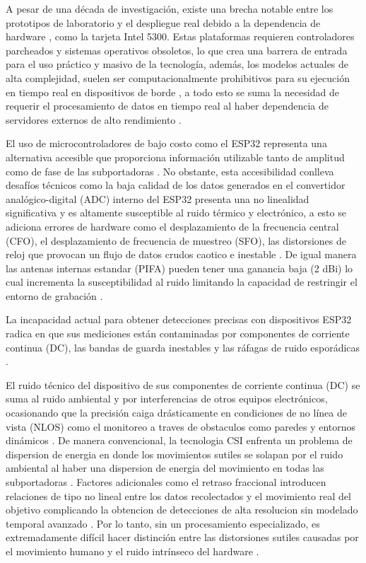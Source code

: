 \documentclass[12pt, a4paper]{article}
\begin{document}
A pesar de una década de investigación, existe una brecha notable entre los prototipos de laboratorio y el despliegue real debido a la dependencia de hardware , como la tarjeta Intel 5300. Estas plataformas requieren controladores parcheados y sistemas operativos obsoletos, lo que crea una barrera de entrada para el uso práctico y masivo de la tecnología, además, los modelos actuales de alta complejidad, suelen ser computacionalmente prohibitivos para su ejecución en tiempo real en dispositivos de borde \cite{kim2026csi} \cite{wiesp}, a todo esto se suma la necesidad de requerir el procesamiento de datos en tiempo real al haber dependencia de servidores externos de alto rendimiento \cite{9900419}.

El uso de microcontroladores de bajo costo como el ESP32 representa una alternativa accesible que proporciona información utilizable tanto de amplitud como de fase de las subportadoras \cite{chaudhari2026device}. No obstante, esta accesibilidad conlleva desafíos técnicos como la baja calidad de los datos generados en el convertidor analógico-digital (ADC) interno del ESP32 presenta una no linealidad significativa y es altamente susceptible al ruido térmico y electrónico, a esto se adiciona errores de hardware como el desplazamiento de la frecuencia central (CFO), el desplazamiento de frecuencia de muestreo (SFO), las distorsiones de reloj que provocan un flujo de datos crudos caotico e inestable \cite{9900419}. De igual manera las antenas internas estandar (PIFA) pueden tener una ganancia baja (2 dBi) lo cual incrementa la susceptibilidad al ruido limitando la capacidad de restringir el entorno de grabación \cite{strohmayer_wifi_2023}.

La incapacidad actual para obtener detecciones precisas con dispositivos ESP32 radica en que sus mediciones están contaminadas por componentes de corriente continua (DC), las bandas de guarda inestables y las ráfagas de ruido esporádicas \cite{kim2026csi}.

El ruido técnico del dispositivo de sus componentes de corriente continua (DC) se suma al ruido ambiental y por interferencias de otros equipos electrónicos, ocasionando que la precisión caiga drásticamente en condiciones de no línea de vista (NLOS) como el monitoreo a traves de obstaculos como paredes y entornos dinámicos \cite{kim2026csi}. De manera convencional, la tecnologia CSI enfrenta un problema de dispersion de energia en donde los movimientos sutiles se solapan por el ruido ambiental al haber una dispersion de energia del movimiento en todas las subportadoras \cite{kong2025cirsenserethinkingwifisensing}. Factores adicionales como el retraso fraccional introducen relaciones de tipo no lineal entre los datos recolectados y el movimiento real del objetivo complicando la obtencion de detecciones de alta resolucion sin modelado temporal avanzado \cite{kong2025cirsenserethinkingwifisensing}. Por lo tanto, sin un procesamiento especializado, es extremadamente difícil hacer distinción entre las distorsiones sutiles causadas por el movimiento humano y el ruido intrínseco del hardware \cite{kim2026csi} \cite{gaire2026staticsense}.
\end{document}
